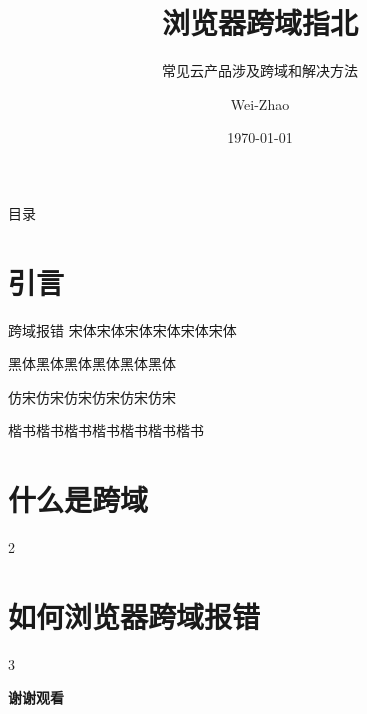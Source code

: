 \documentclass[aspectratio=169,xcolor=dvipsnames]{beamer}
\title[浏览器跨域指北]{浏览器跨域指北}
\subtitle{常见云产品涉及跨域和解决方法}
\author[Wei-Zhao] {Wei-Zhao}
\institute[Anchnet] 
{
    1
}
\date{\today}
\begin{document}
\begin{frame}
    \titlepage
\end{frame}


\begin{frame}{目录}
    \tableofcontents
\end{frame}



\section{引言}
\begin{frame}{跨域报错}
{\songti 宋体宋体宋体宋体宋体宋体}
	
{\heiti 黑体黑体黑体黑体黑体黑体}

{\fangsong 仿宋仿宋仿宋仿宋仿宋仿宋}

{\kaishu 楷书楷书楷书楷书楷书楷书楷书}
\end{frame}

\section{什么是跨域}
\begin{frame}
 2
\end{frame}


\section{如何浏览器跨域报错}
\begin{frame}
 3
\end{frame}


\begin{frame}
    \Huge{\centerline{\textbf{谢谢观看}}}
\end{frame}

\end{document}
